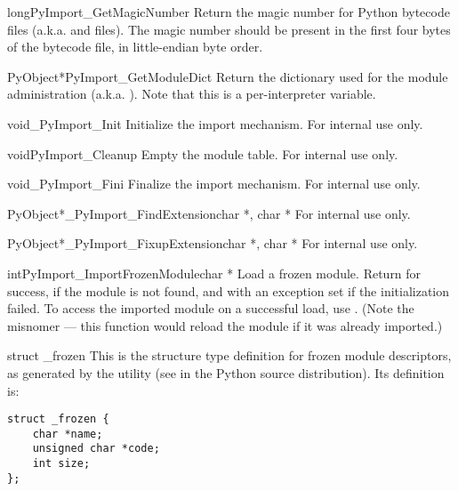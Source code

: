 \documentclass{manual}
\begin{document}
\begin{cfuncdesc}{long}{PyImport_GetMagicNumber}{}
Return the magic number for Python bytecode files (a.k.a. 
and  files).  The magic number should be present in the
first four bytes of the bytecode file, in little-endian byte order.
\end{cfuncdesc}

\begin{cfuncdesc}{PyObject*}{PyImport_GetModuleDict}{}
Return the dictionary used for the module administration
(a.k.a. ).  Note that this is a per-interpreter
variable.
\end{cfuncdesc}

\begin{cfuncdesc}{void}{_PyImport_Init}{}
Initialize the import mechanism.  For internal use only.
\end{cfuncdesc}

\begin{cfuncdesc}{void}{PyImport_Cleanup}{}
Empty the module table.  For internal use only.
\end{cfuncdesc}

\begin{cfuncdesc}{void}{_PyImport_Fini}{}
Finalize the import mechanism.  For internal use only.
\end{cfuncdesc}

\begin{cfuncdesc}{PyObject*}{_PyImport_FindExtension}{char *, char *}
For internal use only.
\end{cfuncdesc}

\begin{cfuncdesc}{PyObject*}{_PyImport_FixupExtension}{char *, char *}
For internal use only.
\end{cfuncdesc}

\begin{cfuncdesc}{int}{PyImport_ImportFrozenModule}{char *}
Load a frozen module.  Return  for success,  if the
module is not found, and  with an exception set if the
initialization failed.  To access the imported module on a successful
load, use .
(Note the misnomer --- this function would reload the module if it was
already imported.)
\end{cfuncdesc}

\begin{ctypedesc}{struct _frozen}
This is the structure type definition for frozen module descriptors,
as generated by the  utility
(see  in the Python source distribution).  Its
definition is:

\begin{verbatim}
struct _frozen {
    char *name;
    unsigned char *code;
    int size;
};
\end{verbatim}
\end{ctypedesc}
\end{document}
